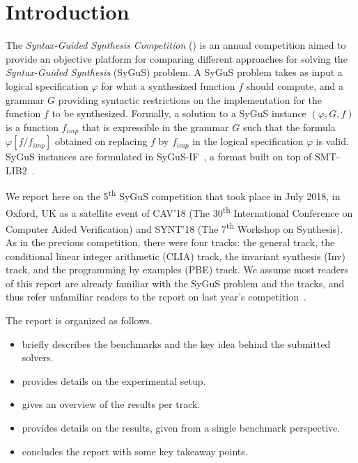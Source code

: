 \section{Introduction}
\label{sec:intro}

The \emph{Syntax-Guided Synthesis Competition} (\comp) is an annual competition aimed to provide
an objective platform for comparing different approaches for solving the \emph{Syntax-Guided Synthesis} (SyGuS) problem.
A SyGuS problem takes as input a logical specification $\varphi$ for what a synthesized function $f$ should compute,
and a grammar $G$ providing syntactic restrictions on the implementation for the function $f$ to be synthesized.
Formally, a solution to a SyGuS instance $(\varphi,G,f)$ is a function $f_{imp}$ that is expressible in the grammar $G$
such that the formula $\varphi[f/f_{imp}]$ obtained on replacing $f$ by $f_{imp}$ in the logical specification $\varphi$ is valid.
SyGuS instances are formulated in SyGuS-IF~\cite{RaghothamanU14}, a format built on top of SMT-LIB2~\cite{smtlib}.

We report here on the 5\textsuperscript{th} SyGuS competition that took place in July 2018,
in Oxford, UK as a satellite event of CAV'18 (The 30\textsuperscript{th} International Conference on Computer Aided Verification)
and SYNT'18 (The 7\textsuperscript{th} Workshop on Synthesis).
As in the previous competition, there were four tracks:
the general track, the conditional linear integer arithmetic (CLIA) track, the invariant synthesis (Inv) track,
and the programming by examples (PBE) track.
We assume most readers of this report are already familiar with the SyGuS problem and the \comp{} tracks,
and thus refer unfamiliar readers to the report on last year's competition~\cite{SyGuSComp17}.

The report is organized as follows.
\begin{itemize}[topsep=0.25em]
    \item {} briefly describes the benchmarks and the key idea behind the submitted solvers.
    \item {} provides details on the experimental setup.
    \item {} gives an overview of the results per track.
    \item {} provides details on the results, given from a single benchmark perspective.
    \item {} concludes the report with some key takeaway points.
\end{itemize}
 
